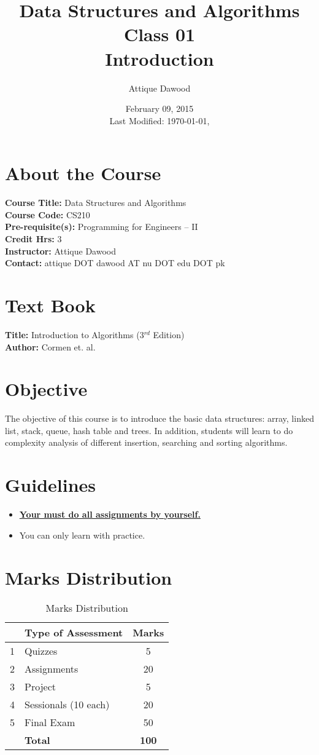 \documentclass[12pt,a4paper]{article}
\title{Data Structures and Algorithms\\Class 01\\Introduction}
\author{Attique Dawood}
\date{February 09, 2015\\[0.2cm] Last Modified: \today, \currenttime}
\begin{document}
\maketitle
\section{About the Course}
\textbf{Course Title:} Data Structures and Algorithms\\
\textbf{Course Code:} CS210\\
\textbf{Pre-requisite(s):} Programming for Engineers -- II\\
\textbf{Credit Hrs:} 3\\
\textbf{Instructor:} Attique Dawood\\
\textbf{Contact:} attique DOT dawood AT nu DOT edu DOT pk\\
\section{Text Book}
\textbf{Title:} Introduction to Algorithms (3$^{rd}$ Edition)\\
\textbf{Author:} Cormen et. al.\\
\section{Objective}
The objective of this course is to introduce the basic data structures: array, linked list, stack, queue, hash table and trees. In addition, students will learn to do complexity analysis of different insertion, searching and sorting algorithms.
\section{Guidelines}
\begin{itemize}
\item \textbf{\underline{Your must do all assignments by yourself.}}
\item You can only learn with practice.
\end{itemize}
\section{Marks Distribution}
\begin{table}[H]
\begin{center}
\vspace{0.3cm}
	\begin{tabular}{llc}
	\hline \hline
		\rule{0pt}{2.6ex} & \textbf{Type of Assessment} & \textbf{Marks}\\
		\hline
		1 \rule{0pt}{2.6ex} & Quizzes & 5\\
		2 & Assignments& 20\\
		3 & Project& 5\\
		4 & Sessionals (10 each) & 20\\
		5 & Final Exam & 50\\
	\hline \hline
	\rule{0pt}{2.6ex} & \textbf{Total} & \textbf{100}\\
	\hline \hline
	\end{tabular}
\end{center}
\label{Marks Distribution}
\caption{Marks Distribution}
\end{table}
\end{document}

